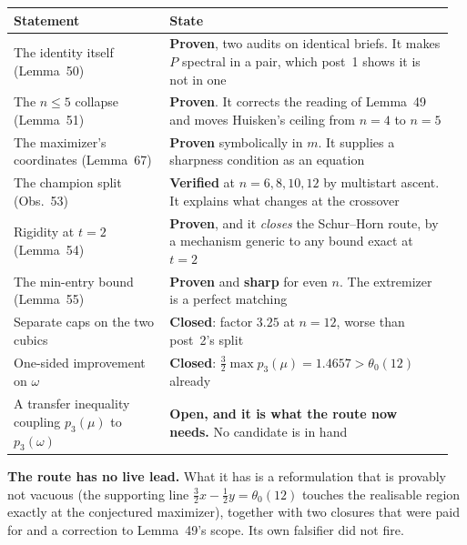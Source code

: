 \begin{longtable}{@{}p{0.34\linewidth}p{0.62\linewidth}@{}}
\toprule
\textbf{Statement} & \textbf{State} \\
\midrule
\endhead
The identity itself (Lemma~50) & \textbf{Proven}, two audits on identical briefs. It makes $P$ spectral in a pair, which post~1 shows it is not in one \\
The $n\le5$ collapse (Lemma~51) & \textbf{Proven}. It corrects the reading of Lemma~49 and moves Huisken's ceiling from $n=4$ to $n=5$ \\
The maximizer's coordinates (Lemma~67) & \textbf{Proven} symbolically in $m$. It supplies a sharpness condition as an equation \\
The champion split (Obs.~53) & \textbf{Verified} at $n=6,8,10,12$ by multistart ascent. It explains what changes at the crossover \\
Rigidity at $t=2$ (Lemma~54) & \textbf{Proven}, and it \emph{closes} the Schur--Horn route, by a mechanism generic to any bound exact at $t=2$ \\
The min-entry bound (Lemma~55) & \textbf{Proven} and \textbf{sharp} for even $n$. The extremizer is a perfect matching \\
Separate caps on the two cubics & \textbf{Closed}: factor $3.25$ at $n=12$, worse than post~2's split \\
One-sided improvement on $\omega$ & \textbf{Closed}: $\tfrac32\max p_3(\mu)=1.4657>\theta_0(12)$ already \\
A transfer inequality coupling $p_3(\mu)$ to $p_3(\omega)$ & \textbf{Open, and it is what the route now needs.} No candidate is in hand \\
\bottomrule
\end{longtable}

\textbf{The route has no live lead.} What it has is a reformulation that is provably not vacuous (the supporting line $\tfrac32x-\tfrac12y=\theta_0(12)$ touches the realisable region exactly at the conjectured maximizer), together with two closures that were paid for and a correction to Lemma~49's scope. Its own falsifier did not fire.
